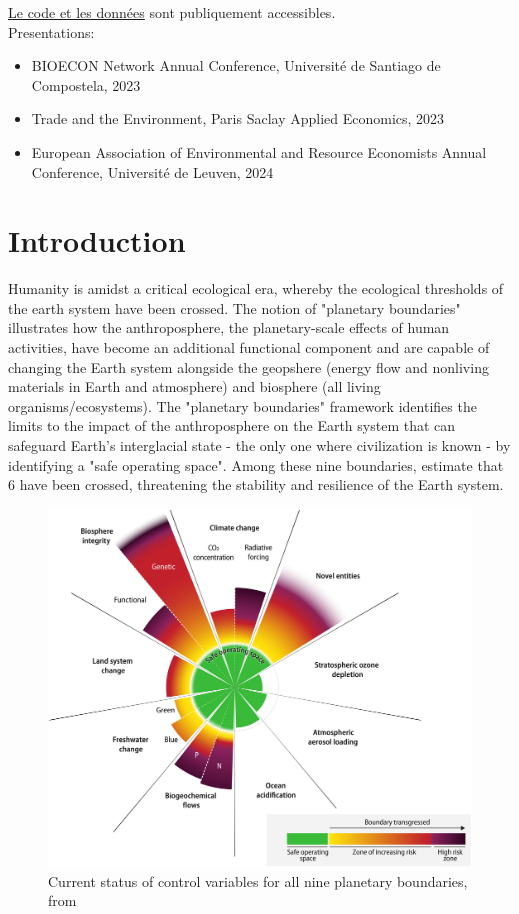 \href{https://github.com/julawson/conservation_farming_totoaba}{Le code et les données} sont publiquement accessibles.
%
\\
Presentations:
\begin{itemize}
\item BIOECON Network Annual Conference, Université de Santiago de Compostela, 2023
\item Trade and the Environment, Paris Saclay Applied Economics, 2023
\item European Association of Environmental and Resource Economists Annual Conference, Université de Leuven, 2024
\end{itemize}

\clearpage
\cleardoublepage


\setcounter{figure}{0}

{}
\onehalfspacing
\chapter*{Introduction}

Humanity is amidst a critical ecological era, whereby the ecological thresholds of the earth system have been crossed. The notion of "planetary boundaries" \citep{rockstrom2009safe,steffen_2015_planetary} illustrates how the anthroposphere, the planetary-scale effects of human activities, have become an additional functional component and are capable of changing the Earth system \citep{richardson_earth_2023} alongside the geopshere (energy flow and nonliving materials in Earth and atmosphere) and biosphere (all living organisms/ecosystems). The "planetary boundaries" framework identifies the limits to the impact of the anthroposphere on the Earth system that can safeguard Earth's interglacial state - the only one where civilization is known - by identifying a "safe operating space". Among these nine boundaries, \cite{richardson_earth_2023} estimate that 6 have been crossed, threatening the stability and resilience of the Earth system. 

\begin{figure}[h]
	\centering
	\includegraphics[width= .7\textwidth]{figures/intro/planetary_bounds.jpg}
	\caption{Current status of control variables for all nine planetary boundaries, from \cite{richardson_earth_2023}}
\end{figure}

